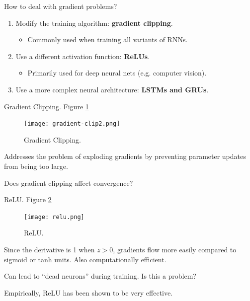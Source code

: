 \documentclass[english]{article}
\begin{document}
\item 
 {How to deal with gradient problems?}

\begin{enumerate}
\item Modify the training algorithm: \textbf{gradient clipping}.
\begin{itemize}
\item Commonly used when training all variants of RNNs.
\end{itemize}
\item Use a different activation function: \textbf{ReLUs}.
\begin{itemize}
\item Primarily used for deep neural nets (e.g. computer vision).
\end{itemize}
\item Use a more complex neural architecture: \textbf{LSTMs and GRUs}.
\end{enumerate}
 

\item 
 {Gradient Clipping}. Figure \ref{Gradient Clipping}

\begin{figure}
\centering
\texttt{[image: gradient-clip2.png]}
    \caption{Gradient Clipping.}
    \label{Gradient Clipping}
\end{figure}

Addresses the problem of exploding gradients by preventing parameter updates from being too large.\\
\begin{algorithmic}
\EndIf
\end{algorithmic}
Does gradient clipping affect convergence?
 

\item 
 {ReLU}.  Figure \ref{ReLU}
\begin{figure}
\centering
\texttt{[image: relu.png]}
    \caption{ReLU.}
    \label{ReLU}
\end{figure}

Since the derivative is 1 when $z>0$, gradients flow more easily compared to sigmoid or tanh units. Also computationally efficient.  

Can lead to ``dead neurons'' during training. Is this a problem? 

Empirically, ReLU has been shown to be very effective.
\end{document}
